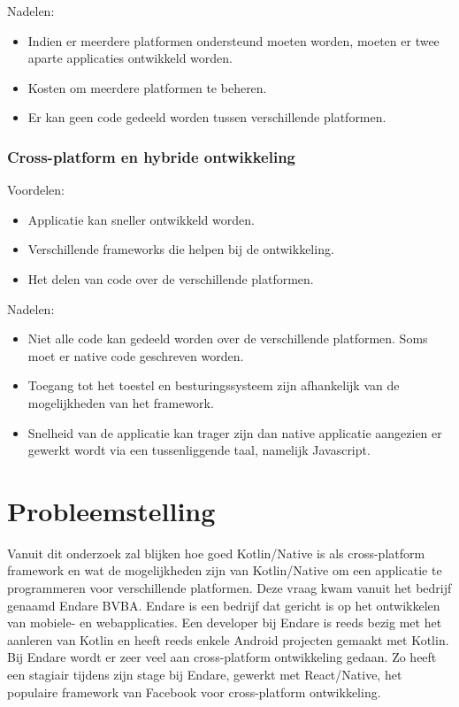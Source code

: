 Nadelen:
\begin{itemize}
	\item Indien er meerdere platformen ondersteund moeten worden, moeten er twee aparte applicaties ontwikkeld worden.
	\item Kosten om meerdere platformen te beheren.
	\item Er kan geen code gedeeld worden tussen verschillende platformen.
\end{itemize}

\subsubsection{Cross-platform en hybride ontwikkeling}
Voordelen:
\begin{itemize}
	\item Applicatie kan sneller ontwikkeld worden.
	\item Verschillende frameworks die helpen bij de ontwikkeling.
	\item Het delen van code over de verschillende platformen.
\end{itemize}

Nadelen:
\begin{itemize}
	\item Niet alle code kan gedeeld worden over de verschillende platformen. Soms moet er native code geschreven worden.
	\item Toegang tot het toestel en besturingssysteem zijn afhankelijk van de mogelijkheden van het framework.
	\item Snelheid van de applicatie kan trager zijn dan native applicatie aangezien er gewerkt wordt via een tussenliggende taal, namelijk Javascript.
\end{itemize}

\section{Probleemstelling}
\label{sec:probleemstelling}
Vanuit dit onderzoek zal blijken hoe goed Kotlin/Native is als cross-platform framework en wat de mogelijkheden zijn van Kotlin/Native om een applicatie te programmeren voor verschillende platformen. Deze vraag kwam vanuit het bedrijf genaamd Endare BVBA. Endare is een bedrijf dat gericht is op het ontwikkelen van mobiele- en webapplicaties. Een developer bij Endare is reeds bezig met het aanleren van Kotlin en heeft reeds enkele Android projecten gemaakt met Kotlin. Bij Endare wordt er zeer veel aan cross-platform ontwikkeling gedaan. Zo heeft een stagiair tijdens zijn stage bij Endare, gewerkt met React/Native, het populaire framework van Facebook voor cross-platform ontwikkeling.

